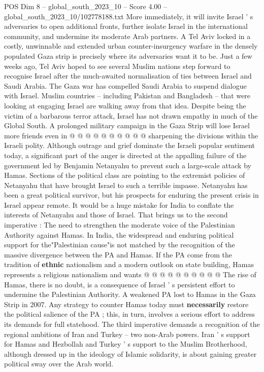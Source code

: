 \begin{textsample}{POS Dim 8 – global\_south\_2023\_10 – Score 4.00 – global\_south\_2023\_10/102778188.txt}
More immediately, it will invite Israel ' s adversaries to open additional fronts, further isolate Israel in the international community, and undermine its moderate Arab partners.
A Tel Aviv locked in a costly, unwinnable and extended urban counter-insurgency warfare in the densely populated Gaza strip is precisely where its adversaries want it to be.
Just a few weeks ago, Tel Aviv hoped to see several Muslim nations step forward to recognise Israel after the much-awaited normalisation of ties between Israel and Saudi Arabia.
The Gaza war has compelled Saudi Arabia to suspend dialogue with Israel.
Muslim countries -- including Pakistan and Bangladesh -- that were looking at engaging Israel are walking away from that idea.
Despite being the victim of a barbarous terror attack, Israel has not drawn empathy in much of the Global South.
A prolonged military campaign in the Gaza Strip will lose Israel more friends even in @ @ @ @ @ @ @ @ @ @ sharpening the divisions within the Israeli polity.
Although outrage and grief dominate the Israeli popular sentiment today, a significant part of the anger is directed at the appalling failure of the government led by Benjamin Netanyahu to prevent such a large-scale attack by Hamas.
Sections of the political class are pointing to the extremist policies of Netanyahu that have brought Israel to such a terrible impasse.
Netanyahu has been a great political survivor, but his prospects for enduring the present crisis in Israel appear remote.
It would be a huge mistake for India to conflate the interests of Netanyahu and those of Israel.
That brings us to the second imperative : The need to strengthen the moderate voice of the Palestinian Authority against Hamas.
In India, the widespread and enduring political support for the"Palestinian cause"is not matched by the recognition of the massive divergence between the PA and Hamas.
If the PA come from the tradition of \textbf{ethnic} nationalism and a modern outlook on state building, Hamas represents a religious nationalism and wants @ @ @ @ @ @ @ @ @ @ The rise of Hamas, there is no doubt, is a consequence of Israel ' s persistent effort to undermine the Palestinian Authority.
A weakened PA lost to Hamas in the Gaza Strip in 2007.
Any strategy to counter Hamas today must \textbf{necessarily} restore the political salience of the PA ; this, in turn, involves a serious effort to address its demands for full statehood.
The third imperative demands a recognition of the regional ambitions of Iran and Turkey -- two non-Arab powers.
Iran ' s support for Hamas and Hezbollah and Turkey ' s support to the Muslim Brotherhood, although dressed up in the ideology of Islamic solidarity, is about gaining greater political sway over the Arab world.

\end{textsample}
